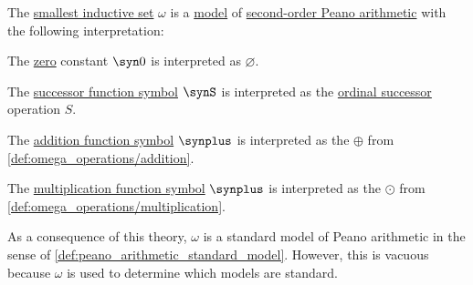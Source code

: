 \begin{theorem}\label{thm:omega_is_model_of_pa}
  The \hyperref[def:smallest_inductive_set]{smallest inductive set} \( \omega \) is a \hyperref[def:hol_semantics/model]{model} of \hyperref[def:peano_arithmetic]{second-order Peano arithmetic} with the following interpretation:
  \begin{thmenum}
     The \hyperref[def:peano_arithmetic/signature/zero]{zero} constant \( \syn0 \) is interpreted as \( \varnothing \).

     The \hyperref[def:peano_arithmetic/signature/succ]{successor function symbol} \( \synS \) is interpreted as the \hyperref[def:ordinal_successor]{ordinal successor} operation \( S \).

     The \hyperref[def:peano_arithmetic/signature/plus]{addition function symbol} \( \synplus \) is interpreted as the \( \oplus \) from \cref{def:omega_operations/addition}.

     The \hyperref[def:peano_arithmetic/signature/times]{multiplication function symbol} \( \synplus \) is interpreted as the \( \odot \) from \cref{def:omega_operations/multiplication}.
  \end{thmenum}
\end{theorem}
\begin{comments}
  \item As a consequence of this theory, \( \omega \) is a standard model of Peano arithmetic in the sense of \cref{def:peano_arithmetic_standard_model}. However, this is vacuous because \( \omega \) is used to determine which models are standard.
\end{comments}
